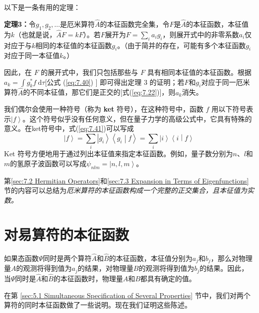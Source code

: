     以下是一条有用的定理：
    \begin{center}
        \parbox{0.8\textwidth}{
            \centering
            \textbf{定理3：}令$g_1,g_2,\ldots$是厄米算符$\hat{A}$的本征函数完全集，令$F$是$\hat{A}$的本征函数，本征值为$k$（也就是说，$\hat{A}F = kF$）。若$F$展开为$F = \sum_{i}a_ig_i$，则展开式中的非零系数$a_i$仅对应于与$k$相同的本征值的本征函数$g_i$。（由于简并的存在，可能有多个本征函数$g_i$对应于同一本征值$k$。）
            
        }
    \end{center}

    因此，在 $F$ 的展开式中，我们只包括那些与 $F$ 具有相同本征值的本征函数。根据 $a_k = \int g_k^{\ast} f \:\mathrm{d}\tau$[公式 (\ref{eq:7.40}) ] 即可得出定理 3 的证明；若$F$和$g_i$对应于同一厄米算符$\hat{A}$的不同本征值，那它们是正交的[式(\ref{eq:7.22})]，则$a_k$消失。

    我们偶尔会使用一种符号（称为 \textbf{ket} 符号），在这种符号中，函数 $f$ 用以下符号表示$\left| f \right\rangle$。这个符号似乎没有任何意义，但在量子力学的高级公式中，它具有特殊的意义。在ket符号中，式(\ref{eq:7.41})可以写成
    \begin{equation}
        \left| f \right\rangle = \sum_{i} \left| g_i\right\rangle \left\langle g_i \middle| f \right\rangle = \sum_i \left| i \right\rangle \left\langle i \middle| f \right\rangle
        \label{eq:7.42}
    \end{equation}
    Ket 符号方便地用于通过列出本征值来指定本征函数。例如，量子数分别为$n$、$l$和$m$的氢原子波函数可以写成$\psi_{nlm} = \left| n,l,m \right\rangle$。

    第\ref{sec:7.2 Hermitian Operators}和\ref{sec:7.3 Expansion in Terms of Eigenfunctions}节的内容可以总结为\textit{厄米算符的本征函数构成一个完整的正交集合，且本征值为实数。}

\section{对易算符的本征函数}
\label{sec:7.4 Eigenfunctions of Commuting Operators}
    如果态函数$\Psi$同时是两个算符$\hat{A}$和$\hat{B}$的本征函数，本征值分别为$a_j$和$b_j$，那么对物理量$A$的观测将得到值为$a_j$的结果，对物理量$B$的观测将得到值为$b_j$的结果。因此，当$\Psi$同时是$\hat{A}$和$\hat{B}$的本征函数时，物理量$A$和$B$都具有确定的值。

    在第 \ref{sec:5.1 Simultaneous Specification of Several Properties} 节中，我们对两个算符的同时本征函数做了一些说明。现在我们证明这些陈述。

